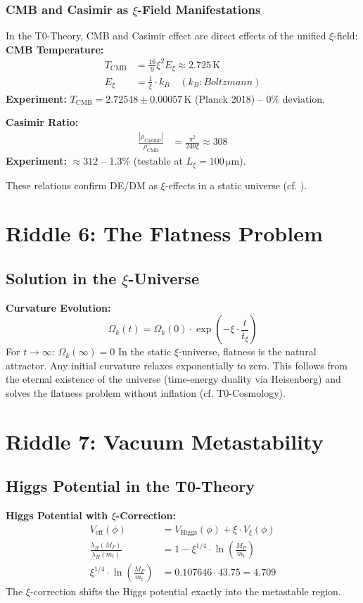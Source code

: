 	\subsubsection{CMB and Casimir as $\xi$-Field Manifestations}
	In the T0-Theory, CMB and Casimir effect are direct effects of the unified $\xi$-field:
	\textbf{CMB Temperature:}
	\begin{align}
		T_{\text{CMB}} &= \frac{16}{9} \xi^2 E_\xi \approx 2.725\,\si{\kelvin} \\
		E_\xi &= \frac{1}{\xi} \cdot k_B \quad (k_B: Boltzmann)
	\end{align}
	\textbf{Experiment:} $T_{\text{CMB}} = 2.72548 \pm 0.00057\,\si{\kelvin}$ (Planck 2018) – 0\% deviation.
	
	\textbf{Casimir Ratio:}
	\begin{align}
		\frac{|\rho_{\text{Casimir}}|}{\rho_{\text{CMB}}} &= \frac{\pi^2}{240 \xi} \approx 308
	\end{align}
	\textbf{Experiment:} $\approx 312$ – 1.3\% (testable at $L_\xi = 100\,\si{\micro\meter}$).
	
	These relations confirm DE/DM as $\xi$-effects in a static universe (cf. \cite{t0_kosmologie}).
	\section{Riddle 6: The Flatness Problem}
	\subsection{Solution in the $\xi$-Universe}
	\textbf{Curvature Evolution:}
	\begin{equation}
		\Omega_k(t) = \Omega_k(0) \cdot \exp\left(-\xi \cdot \frac{t}{t_\xi}\right)
	\end{equation}
	For $t \to \infty$: $\Omega_k(\infty) = 0$
	In the static $\xi$-universe, flatness is the natural attractor. Any initial curvature relaxes exponentially to zero. This follows from the eternal existence of the universe (time-energy duality via Heisenberg) and solves the flatness problem without inflation (cf. T0-Cosmology).
	\section{Riddle 7: Vacuum Metastability}
	\subsection{Higgs Potential in the T0-Theory}
	\textbf{Higgs Potential with $\xi$-Correction:}
	\begin{align}
		V_{\text{eff}}(\phi) &= V_{\text{Higgs}}(\phi) + \xi \cdot V_\xi(\phi) \\
		\frac{\lambda_H(M_P)}{\lambda_H(m_t)} &= 1 - \xi^{1/4} \cdot \ln\left(\frac{M_P}{m_t}\right) \\
		\xi^{1/4} \cdot \ln\left(\frac{M_P}{m_t}\right) &= 0.107646 \cdot 43.75 = 4.709
	\end{align}
	The $\xi$-correction shifts the Higgs potential exactly into the metastable region.
